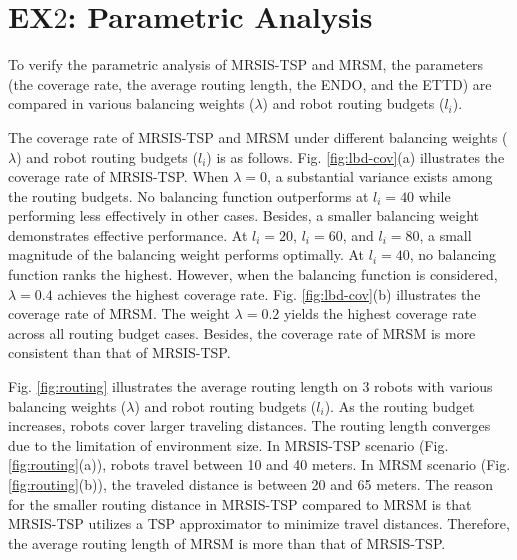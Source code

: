 \section{EX$2$: Parametric Analysis}
To verify the parametric analysis of MRSIS-TSP\cite{li2024mrsis} and MRSM, the parameters (the coverage rate, the average routing length, the ENDO, and the ETTD) are compared in various balancing weights ($\lambda$) and robot routing budgets ($l_i$).

The coverage rate of MRSIS-TSP\cite{li2024mrsis} and MRSM under different balancing weights ($\lambda$) and robot routing budgets ($l_i$) is as follows.
Fig. \ref{fig:lbd-cov}(a) illustrates the coverage rate of MRSIS-TSP\cite{li2024mrsis}.
When $\lambda=0$, a substantial variance exists among the routing budgets.
No balancing function outperforms at $l_i=40$ while performing less effectively in other cases.
Besides, a smaller balancing weight demonstrates effective performance.
At $l_i=20$, $l_i=60$, and $l_i=80$, a small magnitude of the balancing weight performs optimally.
At $l_i=40$, no balancing function ranks the highest. However, when the balancing function is considered, $\lambda=0.4$ achieves the highest coverage rate.
Fig. \ref{fig:lbd-cov}(b) illustrates the coverage rate of MRSM.
The weight $\lambda=0.2$ yields the highest coverage rate across all routing budget cases.
Besides, the coverage rate of MRSM is more consistent than that of MRSIS-TSP\cite{li2024mrsis}.

Fig. \ref{fig:routing} illustrates the average routing length on 3 robots with various balancing weights ($\lambda$) and robot routing budgets ($l_i$).
As the routing budget increases, robots cover larger traveling distances.
The routing length converges due to the limitation of environment size.
In MRSIS-TSP\cite{li2024mrsis} scenario (Fig. \ref{fig:routing}(a)), robots travel between 10 and 40 meters.
In MRSM scenario (Fig. \ref{fig:routing}(b)), the traveled distance is between 20 and 65 meters.
The reason for the smaller routing distance in MRSIS-TSP\cite{li2024mrsis} compared to MRSM is that MRSIS-TSP\cite{li2024mrsis} utilizes a TSP approximator to minimize travel distances.
Therefore, the average routing length of MRSM is more than that of MRSIS-TSP\cite{li2024mrsis}.

